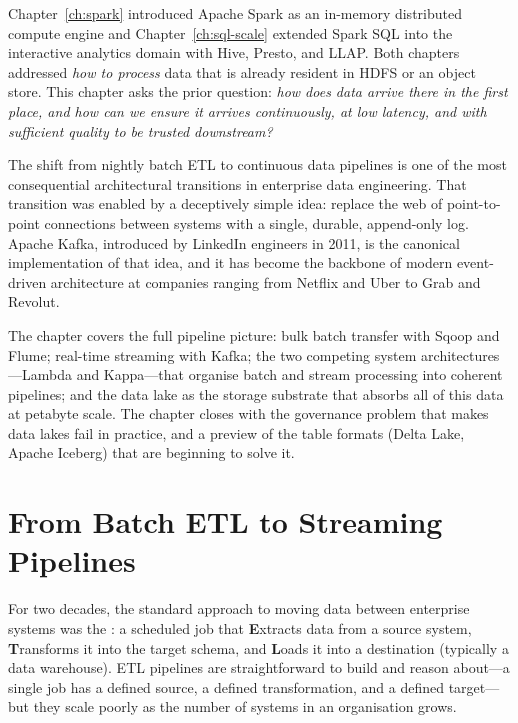 \bigskip

Chapter~\ref{ch:spark} introduced Apache Spark as an in-memory distributed
compute engine and Chapter~\ref{ch:sql-scale} extended Spark SQL into the
interactive analytics domain with Hive, Presto, and LLAP. Both chapters
addressed \emph{how to process} data that is already resident in HDFS or an
object store. This chapter asks the prior question: \emph{how does data arrive
there in the first place, and how can we ensure it arrives continuously, at
low latency, and with sufficient quality to be trusted downstream?}

The shift from nightly batch ETL to continuous data pipelines is one of the
most consequential architectural transitions in enterprise data engineering.
That transition was enabled by a deceptively simple idea: replace the web of
point-to-point connections between systems with a single, durable,
append-only log. Apache Kafka, introduced by LinkedIn engineers in 2011,
is the canonical implementation of that idea, and it has become the backbone
of modern event-driven architecture at companies ranging from Netflix and
Uber to Grab and Revolut.

The chapter covers the full pipeline picture: bulk batch transfer with
Sqoop and Flume; real-time streaming with Kafka; the two competing
system architectures---Lambda and Kappa---that organise batch and stream
processing into coherent pipelines; and the data lake as the storage
substrate that absorbs all of this data at petabyte scale. The chapter
closes with the governance problem that makes data lakes fail in practice,
and a preview of the table formats (Delta Lake, Apache Iceberg) that
are beginning to solve it.

\section{From Batch ETL to Streaming Pipelines}
\label{sec:etl-to-pipelines}

For two decades, the standard approach to moving data between enterprise
systems was the : a scheduled job that \textbf{E}xtracts
data from a source system, \textbf{T}ransforms it into the target schema,
and \textbf{L}oads it into a destination (typically a data warehouse). ETL
pipelines are straightforward to build and reason about---a single job has
a defined source, a defined transformation, and a defined target---but they
scale poorly as the number of systems in an organisation grows.

